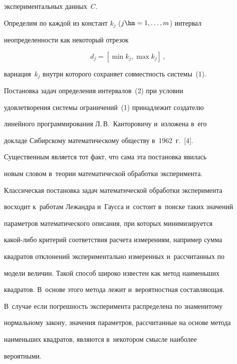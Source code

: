 экспериментальных данных~$C$. 



   Определим по каждой из констант $k_j$ ($j\hm= 1, \ldots, m$) интервал 

неопределенности как некоторый отрезок

  \begin{equation}

  d_j= \left[ \min k_j, \max k_j\right]\,,

  \label{e2-sp}

  \end{equation}

вариация~$k_j$ внутри которого сохраняет совместность системы~(1).



  Постановка задач определения интервалов~(2) при условии 

удовлетворения системы ограничений~(1) принадлежит создателю 

линейного программирования Л.\,В.~Канторовичу и~изложена в~его 

докладе Сибирскому математическому обществу в~1962~г.~[4].

  

  Существенным является тот факт, что сама эта постановка явилась 

новым словом в~теории математической обработки эксперимента. 

Классическая постановка задач математической обработки эксперимента 

восходит к~работам Лежандра и~Гаусса и~состоит в~поиске таких значений 

параметров математического описания, при которых минимизируется 

какой-либо критерий соответствия расчета измерениям, например сумма 

квадратов отклонений экспериментально измеренных и~рассчитанных по 

модели величин. Такой способ широко известен как метод наименьших 

квадратов. В~основе этого метода лежит и~вероятностная составляющая. 

В~случае если погрешность эксперимента распределена по знаменитому 

нормальному закону, значения параметров, рассчитанные на основе метода 

наименьших квадратов, являются в~некотором смысле наиболее 

вероятными.

